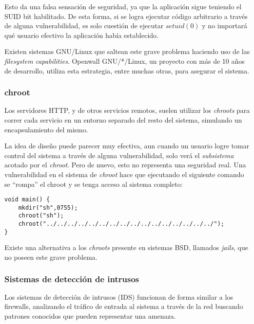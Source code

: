 	\vspace{5 mm}
	
	Esto da una falsa sensaci\'on de seguridad, ya que la aplicaci\'on sigue teniendo el SUID bit habilitado. De esta forma, si se logra ejecutar c\'odigo arbitrario a trav\'es de alguna vulnerabilidad, es solo cuesti\'on de ejecutar $setuid(0)$ y no importar\'a qu\'e usuario efectivo la aplicaci\'on hab\'ia establecido.
	
	Existen sistemas GNU/Linux que saltean este grave problema haciendo uso de las {\em filesystem capabilities}. Openwall GNU/*/Linux, un proyecto con m\'as de 10 a\~nos de desarrollo, utiliza esta estrategia, entre muchas otras, para asegurar el sistema.
	
	\subsubsection{chroot}
		\label{sec:chroot}
	
	Los servidores HTTP, y de otros servicios remotos, suelen utilizar los {\em chroots} para correr cada servicio en un entorno separado del resto del sistema, simulando un encapsulamiento del mismo.
	
	La idea de dise\~no puede parecer muy efectiva, aun cuando un usuario logre tomar control del sistema a trav\'es de alguna vulnerabilidad, solo ver\'a el {\em subsistema} acotado por el {\em chroot}. Pero de nuevo, esto no representa una seguridad real. Una vulnerabilidad en el sistema de {\em chroot} hace que ejecutando el siguiente comando se ``rompa'' el chroot y se tenga acceso al sistema completo:
	
	\vspace{5 mm}
	
	\begin{lstlisting}
void main() {
	mkdir("sh",0755);
	chroot("sh");
	chroot("../../../../../../../../../../../../../../../../");
}
	\end{lstlisting}
	
	\vspace{5 mm}
	
	Existe una alternativa a los {\em chroots} presente en sistemas BSD, llamados {\em jails}, que no poseen este grave problema.
	
	\subsubsection{Sistemas de detecci\'on de intrusos}
		\label{sec:ids}
	
	Los sistemas de detecci\'on de intrusos (IDS) funcionan de forma similar a los firewalls, analizando el tr\'afico de entrada al sistema a trav\'es de la red buscando patrones conocidos que pueden representar una amenaza.
	
